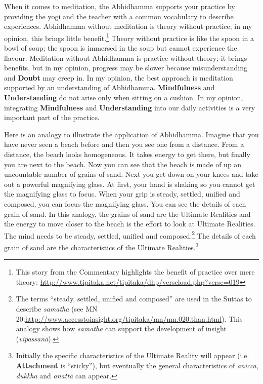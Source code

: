 When it comes to meditation, the Abhidhamma supports your practice by providing the yogi and the teacher with a common vocabulary to describe experiences. Abhidhamma without meditation is theory without practice; in my opinion, this brings little benefit.\footnote{This story from the Commentary highlights the benefit of practice over mere theory: \url{http://www.tipitaka.net/tipitaka/dhp/verseload.php?verse=019}} Theory without practice is like the spoon in a bowl of soup; the spoon is immersed in the soup but cannot experience the flavour. Meditation without Abhidhamma is practice without theory; it brings benefits, but in my opinion, progress may be slower because misunderstanding and \textbf{Doubt} may creep in. In my opinion, the best approach is meditation supported by an understanding of Abhidhamma. \textbf{Mindfulness} and \textbf{Understanding} do not arise only when sitting on a cushion. In my opinion, integrating \textbf{Mindfulness} and \textbf{Understanding} into our daily activities is a very important part of the practice.

Here is an analogy to illustrate the application of Abhidhamma. Imagine that you have never seen a beach before and then you see one from a distance. From a distance, the beach looks homogeneous. It takes energy to get there, but finally you are next to the beach. Now you can see that the beach is made of up an uncountable number of grains of sand. Next you get down on your knees and take out a powerful magnifying glass. At first, your hand is shaking so you cannot get the magnifying glass to focus. When your grip is steady, settled, unified and composed, you can focus the magnifying glass. You can see the details of each grain of sand. In this analogy, the grains of sand are the Ultimate Realities and the energy to move closer to the beach is the effort to look at Ultimate Realities. The mind needs to be steady, settled, unified and composed.\footnote{The terms “steady, settled, unified and composed” are used in the Suttas  to describe \textit{samatha} (see MN 20:\newline \url{http://www.accesstoinsight.org/tipitaka/mn/mn.020.than.html}). This analogy shows how \textit{samatha} can support the development of insight (\textit{vipassanā}).} The details of each grain of sand are the characteristics of the Ultimate Realities.\footnote{Initially the specific characteristics of the Ultimate Reality will appear (i.e. \textbf{Attachment} is “sticky”), but eventually the general characteristics of \textit{anicca}, \textit{dukkha} and \textit{anattā} can appear.}

